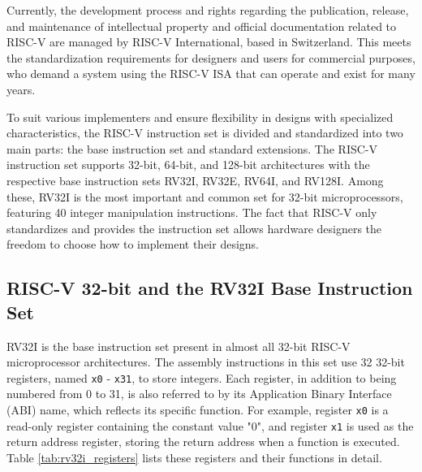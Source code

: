 Currently, the development process and rights regarding the publication, release, and maintenance of intellectual property and official documentation related to RISC-V are managed by RISC-V International, based in Switzerland. This meets the standardization requirements for designers and users for commercial purposes, who demand a system using the RISC-V ISA that can operate and exist for many years.

To suit various implementers and ensure flexibility in designs with specialized characteristics, the RISC-V instruction set is divided and standardized into two main parts: the base instruction set and standard extensions. The RISC-V instruction set supports 32-bit, 64-bit, and 128-bit architectures with the respective base instruction sets RV32I, RV32E, RV64I, and RV128I. Among these, RV32I is the most important and common set for 32-bit microprocessors, featuring 40 integer manipulation instructions. The fact that RISC-V only standardizes and provides the instruction set allows hardware designers the freedom to choose how to implement their designs.

\subsection{RISC-V 32-bit and the RV32I Base Instruction Set}

RV32I \cite{waterman2014riscv} is the base instruction set present in almost all 32-bit RISC-V microprocessor architectures. The assembly instructions in this set use 32 32-bit registers, named \texttt{x0} - \texttt{x31}, to store integers. Each register, in addition to being numbered from 0 to 31, is also referred to by its Application Binary Interface (ABI) name, which reflects its specific function. For example, register \texttt{x0} is a read-only register containing the constant value "0", and register \texttt{x1} is used as the return address register, storing the return address when a function is executed. Table \ref{tab:rv32i_registers} lists these registers and their functions in detail.

